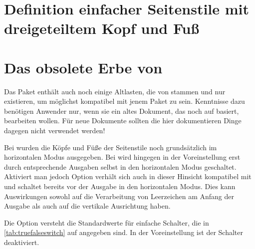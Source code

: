 \section{Definition einfacher Seitenstile mit dreigeteiltem Kopf und Fuß}


\section{Das obsolete Erbe von }

\begin{Explain}
  Das Paket  enthält auch noch einige Altlasten, die
  von  stammen und nur existieren, um möglichst kompatibel
  mit jenem Paket zu sein. Kenntnisse dazu benötigen Anwender nur, wenn sie
  ein altes Dokument, das noch auf  basiert, bearbeiten
  wollen. Für neue Dokumente sollten die hier dokumentieren
  Dinge dagegen nicht verwendet werden!
\end{Explain}

\begin{Declaration}
\end{Declaration}
Bei  wurden die Köpfe und Füße der Seitenstile noch
grundsätzlich im horizontalen Modus ausgegeben. Bei 
wird hingegen in der Voreinstellung erst durch entsprechende Ausgaben selbst
in den horizontalen Modus geschaltet. Aktiviert man jedoch Option
 verhält sich  auch in dieser Hinsicht
kompatibel mit  und schaltet bereits vor der Ausgabe in den
horizontalen Modus. Dies kann Auswirkungen sowohl auf die Verarbeitung von
Leerzeichen am Anfang der Ausgabe als auch auf die vertikale Ausrichtung
haben.

Die Option versteht die Standardwerte für einfache Schalter, die in
\autoref{tab:truefalseswitch} auf  angegeben
sind. In der Voreinstellung ist der Schalter deaktiviert.%
\EndIndexGroup

%
\EndIndexGroup


